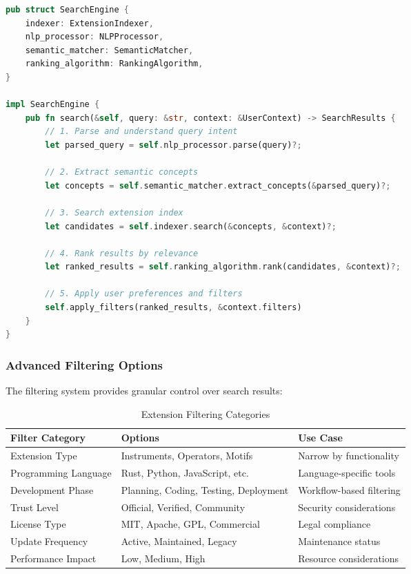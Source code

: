\begin{lstlisting}[language=rust,caption=Search Query Processing Pipeline]
pub struct SearchEngine {
    indexer: ExtensionIndexer,
    nlp_processor: NLPProcessor,
    semantic_matcher: SemanticMatcher,
    ranking_algorithm: RankingAlgorithm,
}

impl SearchEngine {
    pub fn search(&self, query: &str, context: &UserContext) -> SearchResults {
        // 1. Parse and understand query intent
        let parsed_query = self.nlp_processor.parse(query)?;
        
        // 2. Extract semantic concepts
        let concepts = self.semantic_matcher.extract_concepts(&parsed_query)?;
        
        // 3. Search extension index
        let candidates = self.indexer.search(&concepts, &context)?;
        
        // 4. Rank results by relevance
        let ranked_results = self.ranking_algorithm.rank(candidates, &context)?;
        
        // 5. Apply user preferences and filters
        self.apply_filters(ranked_results, &context.filters)
    }
}
\end{lstlisting}

\subsubsection{Advanced Filtering Options}
\label{subsubsec:advanced-filtering-options}

The filtering system provides granular control over search results:

\begin{table}[h]
\centering
\caption{Extension Filtering Categories}
\label{tab:filtering-categories}
\begin{tabular}{@{}lll@{}}
\toprule
\textbf{Filter Category} & \textbf{Options} & \textbf{Use Case} \\
\midrule
Extension Type & Instruments, Operators, Motifs & Narrow by functionality \\
Programming Language & Rust, Python, JavaScript, etc. & Language-specific tools \\
Development Phase & Planning, Coding, Testing, Deployment & Workflow-based filtering \\
Trust Level & Official, Verified, Community & Security considerations \\
License Type & MIT, Apache, GPL, Commercial & Legal compliance \\
Update Frequency & Active, Maintained, Legacy & Maintenance status \\
Performance Impact & Low, Medium, High & Resource considerations \\
\bottomrule
\end{tabular}
\end{table}


